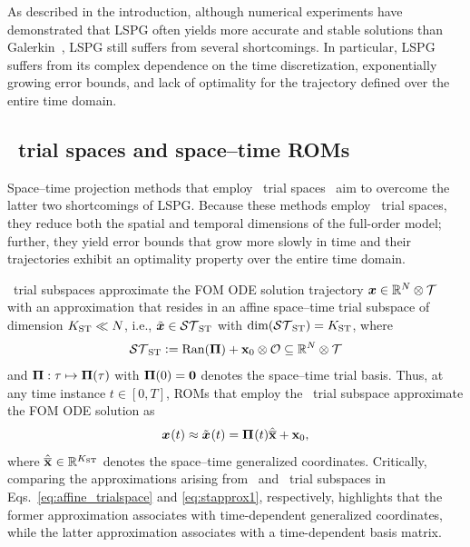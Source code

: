 \documentclass[3p,computermodern,10pt]{elsarticle}
\begin{document}
As described in the introduction, although numerical experiments have
demonstrated that LSPG often yields more accurate and stable
solutions than Galerkin~\cite{bui_thesis,carlberg_lspg_v_galerkin,carlberg_gnat,carlberg_thesis,parish_apg},
LSPG still suffers from several shortcomings. In particular, LSPG suffers from its complex
dependence on the time discretization, exponentially growing error bounds, and
lack of optimality for the trajectory defined over the entire time domain.

\subsection{\spaceTimeAcronym\ trial spaces and space--time ROMs}

Space--time projection methods that employ \spaceTimeAcronym\ trial
spaces~\cite{choi_stlspg,constantine_strom,URBAN2012203,Yano2014ASC,benner_st,bui_thesis}
aim to overcome the latter two shortcomings of LSPG. Because these methods employ \spaceTimeAcronym\ trial
spaces, they reduce both the spatial and temporal dimensions of the full-order
model; further, they yield error bounds that grow more slowly in time and
their trajectories exhibit an optimality property over the entire time domain. 

\spaceTimeAcronym\ trial subspaces approximate the FOM ODE solution
trajectory
	${\boldsymbol x}\in\mathbb{R}^{N}\otimes \mathcal{T}$ with an approximation that resides in an
	affine space--time trial subspace of dimension $K_{\text{ST}}\ll N$, i.e., 
	$\tilde{\boldsymbol x}\in \mathcal{ ST }_{\text{ST}}$ with $\dim(\mathcal{ ST }_{\text{ST}}) =K_{\text{ST}} $, where
\begin{equation}\label{eq:sttrialspace_def}
 \mathcal{ ST }_{\text{ST}} \vcentcolon= 
	\mathrm{Ran}(\boldsymbol \Pi) + 
	{{\mathbf{x}}_0}\otimes\mathcal{O}
	\subseteq \mathbb{R}^{N} \otimes \mathcal{T}
\end{equation}
and $\boldsymbol \Pi:\tau\mapsto\boldsymbol \Pi(\tau)$ with $\boldsymbol \Pi(0) =
\boldsymbol 0$
denotes the space--time trial basis. 
Thus, at any time instance $t\in[0,T]$, ROMs that employ the
\spaceTimeAcronym\ trial subspace approximate the FOM ODE solution as
\begin{equation}\label{eq:stapprox1}
 {\boldsymbol x}^{}(t) \approx \tilde{\boldsymbol x}^{}(t)  = \boldsymbol \Pi^{}(t) \hat{\mathbf{\overline{x}}} + {{\mathbf{x}}_0},
\end{equation}
where $\hat{\mathbf{\overline{x}}}^{} \in \mathbb{R}^{K_{\text{ST}}}$ denotes the space--time generalized coordinates. 
Critically, comparing the approximations arising from \spatialAcronym\ and
\spaceTimeAcronym\ trial subspaces in Eqs.~\eqref{eq:affine_trialspace} and \eqref{eq:stapprox1}, respectively,
highlights that the former approximation associates with time-dependent
generalized coordinates, while the latter approximation associates with a
time-dependent basis matrix.
\end{document}
